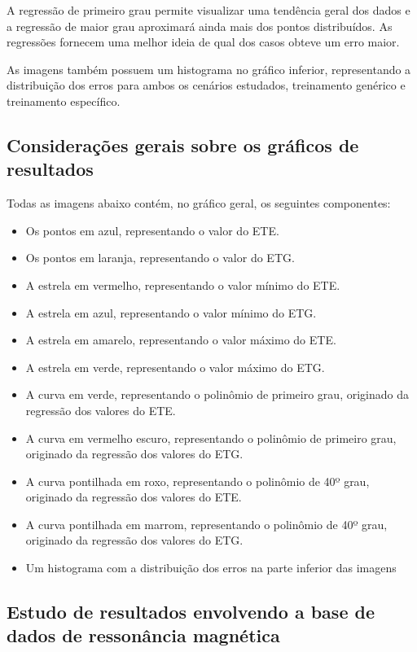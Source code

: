 A regressão de primeiro grau permite visualizar uma tendência geral dos dados e a regressão de maior grau aproximará ainda mais dos pontos distribuídos. As regressões fornecem uma melhor ideia de qual dos casos obteve um erro maior.

As imagens também possuem um histograma no gráfico inferior, representando a distribuição dos erros para ambos os cenários estudados, treinamento genérico e treinamento específico.

\subsection{Considerações gerais sobre os gráficos de resultados}
\label{sec:result:consideracoes-gerais}

Todas as imagens abaixo contém, no gráfico geral, os seguintes componentes:

\begin{itemize}
    \item Os pontos em azul, representando o valor do ETE.
    \item Os pontos em laranja, representando o valor do ETG.
    \item A estrela em vermelho, representando o valor mínimo do ETE.
    \item A estrela em azul, representando o valor mínimo do ETG.
    \item A estrela em amarelo, representando o valor máximo do ETE.
    \item A estrela em verde, representando o valor máximo do ETG.
    \item A curva em verde, representando o polinômio de primeiro grau, originado da regressão dos valores do ETE.
    \item A curva em vermelho escuro, representando o polinômio de primeiro grau, originado da regressão dos valores do ETG.
    \item A curva pontilhada em roxo, representando o polinômio de 40º grau, originado da regressão dos valores do ETE.
    \item A curva pontilhada em marrom, representando o polinômio de 40º grau, originado da regressão dos valores do ETG.
    \item Um histograma com a distribuição dos erros na parte inferior das imagens
\end{itemize}

\subsection{Estudo de resultados envolvendo a base de dados de ressonância magnética}
\label{sec:result:mri}
